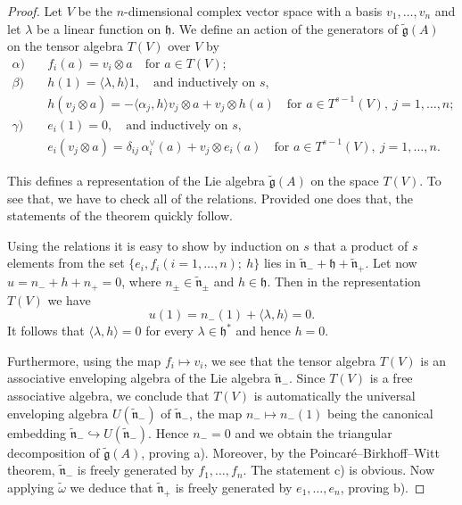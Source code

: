 \documentclass[12pt]{article}
\begin{document}
\begin{proof}
    Let $V$ be the $n$-dimensional complex vector space with a basis
    $v_1, \ldots, v_n$ and let $\lambda$ be a linear function on $\mathfrak{h}$.
    We define an action of the generators of $\tilde{\mathfrak{g}}(A)$ on the
    tensor algebra $T(V)$ over $V$ by
    \begin{align*}
        \alpha)\quad & f_i(a) = v_i \otimes a \quad \text{for } a \in T(V);                    \\
        \beta)\quad  & h(1) = \langle \lambda, h \rangle 1, \quad
        \text{and inductively on $s$,}                                                         \\
                     & h(v_j \otimes a) = -\langle \alpha_j, h \rangle v_j \otimes a
        + v_j \otimes h(a)
        \quad \text{for } a \in T^{s-1}(V), \ j=1,\ldots,n;                                    \\
        \gamma)\quad & e_i(1) = 0, \quad \text{and inductively on $s$,}                        \\
                     & e_i(v_j \otimes a) = \delta_{ij}\,\alpha_i^\vee(a) + v_j \otimes e_i(a)
        \quad \text{for } a \in T^{s-1}(V), \ j=1,\ldots,n.
    \end{align*}

    This defines a representation of the Lie algebra $\tilde{\mathfrak{g}}(A)$ on the space $T(V)$. To see that, we have to check all of the relations. Provided one does that, the statements of the theorem quickly follow.

    Using the relations it is easy to show by induction on $s$ that a product of $s$
    elements from the set $\{e_i, f_i (i = 1, \ldots, n); \ h\}$ lies in
    $\tilde{\mathfrak{n}}_- + \mathfrak{h} + \tilde{\mathfrak{n}}_+$. Let now
    $u = n_- + h + n_+ = 0$, where $n_\pm \in \tilde{\mathfrak{n}}_\pm$ and
    $h \in \mathfrak{h}$. Then in the representation $T(V)$ we have
    \[
        u(1) = n_-(1) + \langle \lambda, h \rangle = 0.
    \]
    It follows that $\langle \lambda, h \rangle = 0$ for every
    $\lambda \in \mathfrak{h}^*$ and hence $h = 0$.

    Furthermore, using the map $f_i \mapsto v_i$, we see that the tensor algebra $T(V)$ is an associative enveloping algebra of the Lie algebra $\tilde{\mathfrak{n}}_-$. Since $T(V)$ is a free associative algebra, we conclude that $T(V)$ is automatically the universal enveloping algebra $U(\tilde{\mathfrak{n}}_-)$ of $\tilde{\mathfrak{n}}_-$, the map $n_- \mapsto n_-(1)$ being the canonical embedding $\tilde{\mathfrak{n}}_- \hookrightarrow U(\tilde{\mathfrak{n}}_-)$. Hence $n_- = 0$ and we obtain the triangular decomposition of $\tilde{\mathfrak{g}}(A)$, proving a). Moreover, by the Poincaré--Birkhoff--Witt theorem, $\tilde{\mathfrak{n}}_-$ is freely generated by $f_1, \ldots, f_n$. The statement c) is obvious. Now applying $\tilde{\omega}$ we deduce that $\tilde{\mathfrak{n}}_+$ is freely generated by $e_1, \ldots, e_n$, proving b).


\end{proof}
\end{document}

